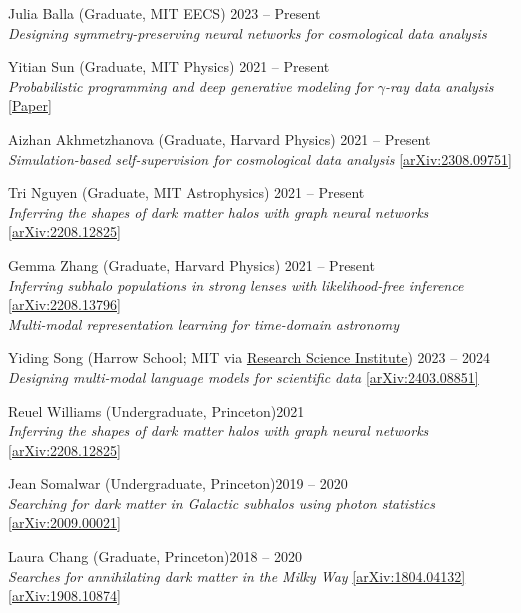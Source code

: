 \documentclass[letterpaper,11pt]{article}
\newenvironment{packed_itemize}{
\begin{itemize}[label=\raisebox{0.25ex}{\tiny$\bullet$}]
  \setlength{\itemsep}{4.2pt}
  \setlength{\parskip}{0pt}
  \setlength{\parsep}{0pt}}{\end{itemize}
}
\begin{document}
\begin{packed_itemize}
  \item Julia Balla (Graduate, {MIT EECS}) \hfill 2023 -- Present \\ \emph{Designing symmetry-preserving neural networks for cosmological data analysis}
  \item Yitian Sun (Graduate, {MIT Physics}) \hfill 2021 -- Present \\ \emph{Probabilistic programming and deep generative modeling for $\gamma$-ray data analysis}  \href{https://ml4astro.github.io/icml2023/assets/52.pdf}{[Paper]}
  \item Aizhan Akhmetzhanova (Graduate, {Harvard Physics}) \hfill 2021 -- Present \\ \emph{Simulation-based self-supervision for cosmological data analysis} \href{https://arxiv.org/abs/2308.09751}{[arXiv:2308.09751]}
  \item Tri Nguyen (Graduate, {MIT Astrophysics}) \hfill 2021 -- Present \\ \emph{Inferring the shapes of dark matter halos with graph neural networks} \href{https://arxiv.org/abs/2208.12825}{[arXiv:2208.12825]}
  \item Gemma Zhang (Graduate, {Harvard Physics}) \hfill 2021 -- Present \\ \emph{Inferring subhalo populations in strong lenses with likelihood-free inference} \href{https://arxiv.org/abs/2208.13796}{[arXiv:2208.13796]} \\ \emph{Multi-modal representation learning for time-domain astronomy} 
  
    \item Yiding Song (Harrow School; {MIT} via \href{https://www.cee.org/programs/research-science-institute}{Research Science Institute}) \hfill 2023 -- 2024 \\ \emph{Designing multi-modal language models for scientific data} \href{https://arxiv.org/abs/2403.08851}{[arXiv:2403.08851]}
  \item Reuel Williams (Undergraduate, {Princeton})\hfill 2021 \\ \emph{Inferring the shapes of dark matter halos with graph neural networks} \href{https://arxiv.org/abs/2208.12825}{[arXiv:2208.12825]}
  \item Jean Somalwar (Undergraduate, {Princeton})\hfill 2019 -- 2020 \\ \emph{Searching for dark matter in Galactic subhalos using photon statistics} \href{https://arxiv.org/abs/2009.00021}{[arXiv:2009.00021]}
  \item Laura Chang (Graduate, {Princeton})\hfill 2018 -- 2020 \\ \emph{Searches for annihilating dark matter in the Milky Way} \href{https://arxiv.org/abs/1804.04132}{[arXiv:1804.04132]}\,\href{https://arxiv.org/abs/1908.10874}{[arXiv:1908.10874]}
  \end{packed_itemize}
\vspace{2.0mm}
\end{document}

